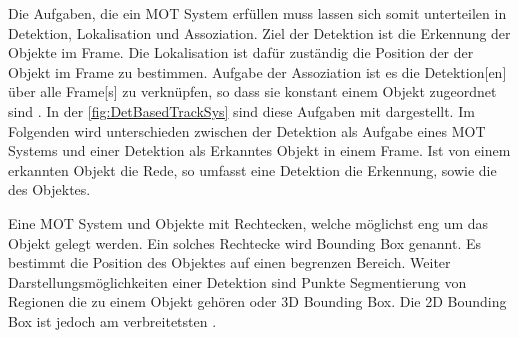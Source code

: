 Die Aufgaben, die ein \gls{MOT} System erfüllen muss lassen sich somit unterteilen in \gls{Detektion}, \gls{Lokalisation} und \gls{Assoziation}. Ziel der \gls{Detektion} ist die Erkennung der Objekte im \gls{Frame}. Die \gls{Lokalisation} ist dafür zuständig die Position der der Objekt im \gls{Frame} zu bestimmen. Aufgabe der \gls{Assoziation} ist es die \gls{Detektion}[en] über alle \gls{Frame}[s] zu verknüpfen, so dass sie konstant einem Objekt zugeordnet sind \cite{CLEAR.2008, HOTA}. In der \autoref{fig:DetBasedTrackSys} sind diese Aufgaben mit dargestellt. Im Folgenden wird unterschieden zwischen der \gls{Detektion} als Aufgabe eines \gls{MOT} Systems und einer \gls{Detektion} als Erkanntes Objekt in einem \gls{Frame}. Ist von einem erkannten Objekt die Rede, so umfasst eine \gls{Detektion} die Erkennung, sowie die  des Objektes. \par

Eine \gls{MOT} System  und  Objekte mit Rechtecken, welche möglichst eng um das Objekt gelegt werden. Ein solches Rechtecke wird \gls{Bounding Box} genannt. Es bestimmt die Position des Objektes auf einen begrenzen Bereich. Weiter Darstellungsmöglichkeiten einer \gls{Detektion} sind Punkte Segmentierung von Regionen die zu einem Objekt gehören oder 3D \gls{Bounding Box}. Die 2D \gls{Bounding Box} ist jedoch am verbreitetsten \cite{MOT15, HOTA, Luo.2022}. \par 


